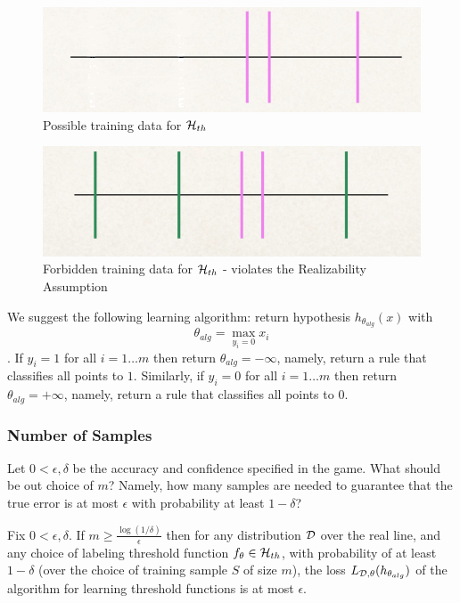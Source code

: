 \begin{figure}[h!]
\centering
\includegraphics[scale=0.3]{thresholds1b.png}
\caption{Possible training data for $\mathcal{H}_{th}$}
\end{figure}

\begin{figure}[h!]
\centering
\includegraphics[scale=0.3]{thresholds2.png}
\caption{Forbidden training data for $\mathcal{H}_{th}$ - violates the Realizability Assumption}
\end{figure}


We suggest the following learning algorithm: return hypothesis $h_{\theta_{alg}}(x)$ with $$\theta_{alg} = \max_{y_i=0} x_i$$.
If $y_i=1$ for all $i=1\ldots m$ then return $\theta_{alg} = -\infty$, namely, return a rule that classifies all points to $1$. Similarly, if $y_i=0$ for all $i=1\ldots m$ then return $\theta_{alg} = +\infty$, namely, return a rule that classifies all points to $0$.

\vspace{5mm}

\subsubsection*{Number of Samples}

Let $0<\epsilon,\delta$ be the accuracy and confidence specified in the game.
What should be out choice of $m$? Namely, how many samples are needed to guarantee that the true error is at most $\epsilon$ with probability at least $1-\delta$?

\begin{claim}
Fix $0<\epsilon,\delta$.
If $m \ge \frac{\log(1/\delta)}{\epsilon}$ then for any distribution $\mathcal{D}$ over the real line, and any choice of  labeling threshold function $f_\theta \in \mathcal{H}_{th}$,  with probability of at least $1-\delta$ (over the choice of training sample $S$ of size $m$), the loss
$L_{\mathcal{D},\theta}(h_{\theta_{alg}})$
of the algorithm for learning threshold functions is at most $\epsilon.$
\end{claim}

